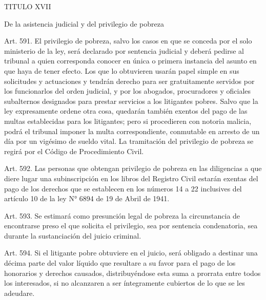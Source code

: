     TITULO XVII

    De la asistencia judicial y del privilegio de pobreza


    Art. 591. El privilegio de pobreza, salvo los casos en que se conceda por el solo ministerio de la ley, será declarado por sentencia judicial y deberá pedirse al tribunal a quien corresponda conocer en única o primera instancia del asunto en que haya de tener efecto.
    Los que lo obtuvieren usarán papel simple en sus solicitudes y actuaciones y tendrán derecho para ser gratuitamente servidos por los funcionarlos del orden judicial, y por los abogados, procuradores y oficiales subalternos designados para prestar servicios a los litigantes pobres.
    Salvo que la ley expresamente ordene otra cosa, quedarán también exentos del pago de las multas establecidas para los litigantes; pero si procedieren con notoria malicia, podrá el tribunal imponer la multa correspondiente, conmutable en arresto de un día por un vigésimo de sueldo vital.
    La tramitación del privilegio de pobreza se regirá por el Código de Procedimiento Civil.


    Art. 592. Las personas que obtengan privilegio de pobreza en las diligencias a que diere lugar una subinscripción en los libros del Registro Civil estarán exentas del pago de los derechos que se establecen en los números 14 a 22 inclusives del artículo 10 de la ley N° 6894 de 19 de Abril de 1941.

    Art. 593. Se estimará como presunción legal de pobreza la circunstancia de encontrarse preso el que solicita el privilegio, sea por sentencia condenatoria, sea durante la sustanciación del juicio criminal.

    Art. 594. Si el litigante pobre obtuviere en el juicio, será obligado a destinar una décima parte del valor líquido que resultare a su favor para el pago de los honorarios y derechos causados, distribuyéndose esta suma a prorrata entre todos los interesados, si no alcanzaren a ser íntegramente cubiertos de lo que se les adeudare.

